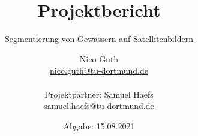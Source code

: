 \documentclass[
  fontsize=12pt,
  bibliography=totoc,     %
  captions=tableheading,  %
  titlepage=firstiscover, %
  parskip=half,           %
]{scrartcl}
\author{%
  Nico Guth\\%
  \href{mailto:nico.guth@tu-dortmund.de}{nico.guth@tu-dortmund.de}%
  \\ \\%
  \small Projektpartner: Samuel Haefs\\%
  \small \href{mailto:samuel.haefs@tu-dortmund.de}{samuel.haefs@tu-dortmund.de}%
}
\title{Projektbericht}
\subtitle{Segmentierung von Gewässern auf Satellitenbildern}
\date{Abgabe: 15.08.2021}
\begin{document}
\begin{spacing}{1}
  \maketitle
\end{spacing}
\thispagestyle{empty}
\tableofcontents
\newpage







\printbibliography{}


\end{document}

